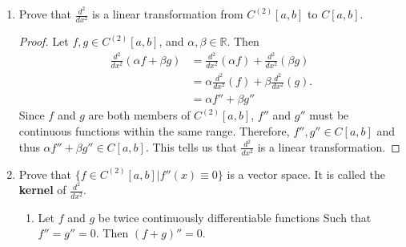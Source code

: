 \documentclass{article}
\begin{document}
\begin{enumerate}
\begin{enumerate}
\begin{proof}
\begin{align*}
                                                         & = \lVert f_m\rVert - \lVert f_n\rVert
                              \end{align*}
                              So it follows that
                              \[
                                    \lVert f_m\rVert - \lVert f_n\rVert \leq \lVert f_m-f_n\rVert < \varepsilon
                                    \implies \lVert f_m\rVert - \lVert f_n\rVert< \varepsilon.
                              \]
                              Thus, $\{f_n\}$ converges to a real number.
                        \end{proof}
                  \item Prove that $\frac{d^2}{dx^2}$ is a linear
                        transformation from $C^{(2)}[a,b]$ to $C[a,b]$.
                        \begin{proof}
                              Let $f, g\in C^{(2)}[a,b]$, and $\alpha, \beta\in\mathbb{R}$. Then
                              \begin{align*}
                                    \frac{d^2}{dx^2}(\alpha f+\beta g) & = \frac{d^2}{dx^2}(\alpha f) + \frac{d^2}{dx^2}(\beta g) \\
                                                                       & = \alpha\frac{d^2}{dx^2}(f) + \beta\frac{d^2}{dx^2}(g).  \\
                                                                       & = \alpha f'' + \beta g''
                              \end{align*}
                              Since $f$ and $g$ are both members of $C^{(2)}[a,b]$, $f''$ and
                              $g''$ must be continuous functions within the same range. Therefore,
                              $f'',g''\in C[a,b]$ and thus $\alpha f'' + \beta g''\in C[a,b]$.
                              This tells us that $\frac{d^2}{dx^2}$ is a linear transformation.
                        \end{proof}
                  \item Prove that $\{f\in C^{(2)}[a,b]|f''(x)\equiv 0\}$
                        is a vector space. It is called the \textbf{kernel} of
                        $\frac{d^2}{dx^2}$.
                        \begin{enumerate}
                              \item Let $f$ and $g$ be twice continuously differentiable functions
                                    Such that $f''=g''=0$. Then $(f+g)''=0$.

\end{enumerate}
\end{enumerate}
\end{enumerate}
\end{document}
